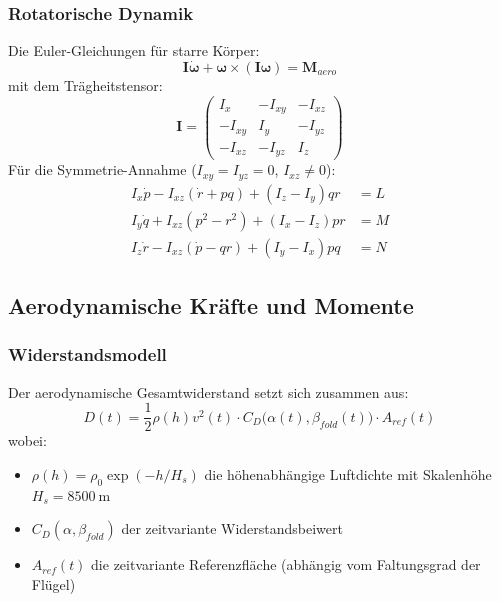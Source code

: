 ﻿\documentclass[12pt,a4paper]{article}
\theoremstyle{remark}
\begin{document}
	\subsubsection{Rotatorische Dynamik}
	
	Die Euler-Gleichungen für starre Körper:
	\begin{equation}
		\mathbf{I}\dot{\boldsymbol{\omega}} + \boldsymbol{\omega} \times (\mathbf{I}\boldsymbol{\omega}) = \mathbf{M}_{aero}
		\label{eq:euler_rot}
	\end{equation}
	mit dem Trägheitstensor:
	\begin{equation}
		\mathbf{I} = \begin{pmatrix} I_x & -I_{xy} & -I_{xz} \\ -I_{xy} & I_y & -I_{yz} \\ -I_{xz} & -I_{yz} & I_z \end{pmatrix}
	\end{equation}
	Für die Symmetrie-Annahme ($I_{xy} = I_{yz} = 0$, $I_{xz} \neq 0$):
	\begin{align}
		I_x \dot{p} - I_{xz}(\dot{r} + pq) + (I_z - I_y)qr &= L \\
		I_y \dot{q} + I_{xz}(p^2 - r^2) + (I_x - I_z)pr &= M \\
		I_z \dot{r} - I_{xz}(\dot{p} - qr) + (I_y - I_x)pq &= N
	\end{align}
	
	\subsection{Aerodynamische Kräfte und Momente}
	
	\subsubsection{Widerstandsmodell}
	
	Der aerodynamische Gesamtwiderstand setzt sich zusammen aus:
	\begin{equation}
		D(t) = \frac{1}{2}\rho(h) v^2(t) \cdot C_D\bigl(\alpha(t), \beta_{fold}(t)\bigr) \cdot A_{ref}(t)
		\label{eq:drag}
	\end{equation}
	wobei:
	\begin{itemize}
		\item $\rho(h) = \rho_0 \exp(-h/H_s)$ die höhenabhängige Luftdichte mit Skalenhöhe $H_s = \SI{8500}{\m}$
		\item $C_D(\alpha, \beta_{fold})$ der zeitvariante Widerstandsbeiwert
		\item $A_{ref}(t)$ die zeitvariante Referenzfläche (abhängig vom Faltungsgrad der Flügel)
	\end{itemize}
	
\end{document}
